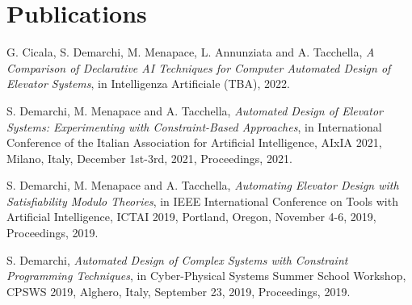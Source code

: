 \section{\sc Publications}

G. Cicala, S. Demarchi, M. Menapace, L. Annunziata and A. Tacchella, \textit{A
Comparison of Declarative AI Techniques for Computer Automated Design of
Elevator Systems}, in Intelligenza Artificiale (TBA), 2022.

S. Demarchi, M. Menapace and A. Tacchella, \textit{Automated Design of Elevator Systems: Experimenting with Constraint-Based Approaches}, in International Conference of the Italian Association for Artificial Intelligence, AIxIA 2021, Milano, Italy, December 1st-3rd, 2021, Proceedings, 2021.

S. Demarchi, M. Menapace and A. Tacchella, \textit{Automating Elevator 
	Design with Satisfiability Modulo Theories}, in IEEE International 
Conference on Tools with Artificial Intelligence, ICTAI 2019, Portland, 
Oregon, November 4-6, 2019, Proceedings, 2019.

S. Demarchi, \textit{Automated Design of Complex Systems with Constraint 
	Programming Techniques}, in Cyber-Physical Systems Summer School 
Workshop, CPSWS 2019, Alghero, Italy, September 23, 2019, Proceedings, 
2019.
